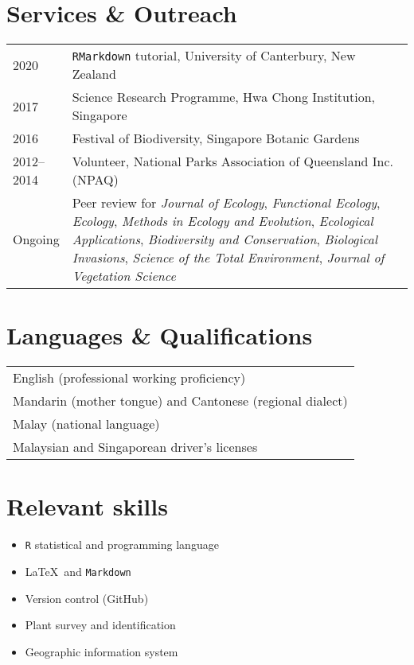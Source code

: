 \documentclass[a4paper]{article}
\begin{document}
\section*{Services \& Outreach}
\begin{tabular}{p{0.13\linewidth} p{0.87\linewidth}}
2020 & \texttt{RMarkdown} tutorial, University of Canterbury, New Zealand \\
2017 & Science Research Programme, Hwa Chong Institution, Singapore \\
2016 & Festival of Biodiversity, Singapore Botanic Gardens \\
2012--2014 & Volunteer, National Parks Association of Queensland Inc. (NPAQ) \\
Ongoing & Peer review for \textit{Journal of Ecology}, \textit{Functional Ecology}, \textit{Ecology}, \textit{Methods in Ecology and Evolution}, \textit{Ecological Applications}, \textit{Biodiversity and Conservation}, \textit{Biological Invasions}, \textit{Science of the Total Environment}, \textit{Journal of Vegetation Science}\\
\end{tabular}


\section*{Languages \& Qualifications}
\begin{tabular}{p{\linewidth}}
English (professional working proficiency) \\
Mandarin (mother tongue) and Cantonese (regional dialect) \\
Malay (national language) \\
Malaysian and Singaporean driver's licenses \\
\end{tabular}


\section*{Relevant skills}
\begin{multicols}{2}
\begin{itemize}
	\item \texttt{R} statistical and programming language
	\item \LaTeX~and \texttt{Markdown}
	\item Version control (GitHub)
\end{itemize}
\columnbreak
\begin{itemize}
	\item Plant survey and identification
	\item Geographic information system
\end{itemize}
\end{multicols}
\end{document}
